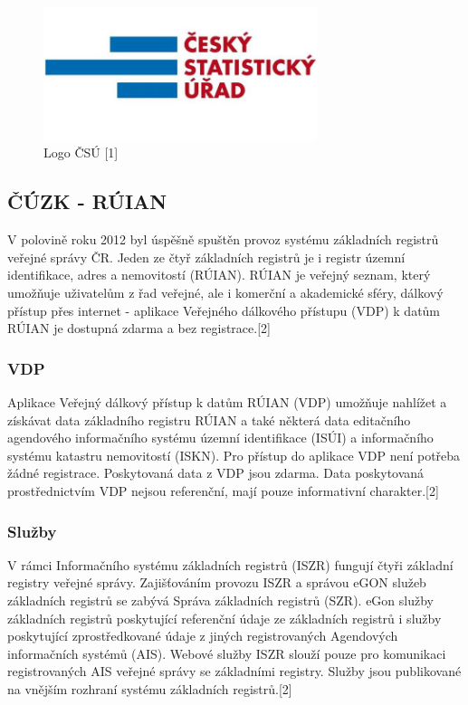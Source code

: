 \documentclass[a4paper, 12pt]{article}
\begin{document}
\begin{figure}[h!]
	\centering
	\includegraphics[width=8cm]{csu.jpg}
	\caption{Logo ČSÚ [1]}
\end{figure}

\subsection{ČÚZK - RÚIAN}
V polovině roku 2012 byl úspěšně spuštěn provoz systému základních registrů veřejné správy ČR. Jeden ze čtyř základních registrů je i registr územní identifikace, adres a nemovitostí (RÚIAN). RÚIAN je veřejný seznam, který umožňuje uživatelům z řad veřejné, ale i komerční a akademické sféry, dálkový přístup přes internet - aplikace Veřejného dálkového přístupu (VDP) k datům RÚIAN je dostupná zdarma a bez registrace.[2]

\subsubsection{VDP}
Aplikace Veřejný dálkový přístup k datům RÚIAN (VDP) umožňuje nahlížet a získávat data základního registru RÚIAN a také některá data editačního agendového informačního systému územní identifikace (ISÚI) a informačního systému katastru nemovitostí (ISKN). Pro přístup do aplikace VDP není potřeba žádné registrace. Poskytovaná data z VDP jsou zdarma. Data poskytovaná prostřednictvím VDP nejsou referenční, mají pouze informativní charakter.[2]

\subsubsection{Služby}
V rámci Informačního systému základních registrů (ISZR) fungují čtyři základní registry veřejné správy. Zajišťováním provozu ISZR a správou eGON služeb základních registrů se zabývá Správa základních registrů (SZR). eGon služby základních registrů poskytující referenční údaje ze základních registrů i služby poskytující zprostředkované údaje z jiných registrovaných Agendových informačních systémů (AIS). Webové služby ISZR slouží pouze pro komunikaci registrovaných AIS veřejné správy se základními registry.
Služby jsou publikované na vnějším rozhraní systému základních registrů.[2]
\end{document}

